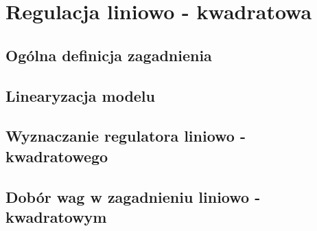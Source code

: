 \section{Regulacja liniowo - kwadratowa}
\label{sec:lqr}


\subsection{Ogólna definicja zagadnienia}
\label{sub:lqr-def}


\subsection{Linearyzacja modelu}
\label{sub:lqr-lin}


\subsection{Wyznaczanie regulatora liniowo - kwadratowego}
\label{sub:lqr-ctrl}


\subsection{Dobór wag w zagadnieniu liniowo - kwadratowym}
\label{sub:lqr-weights}

